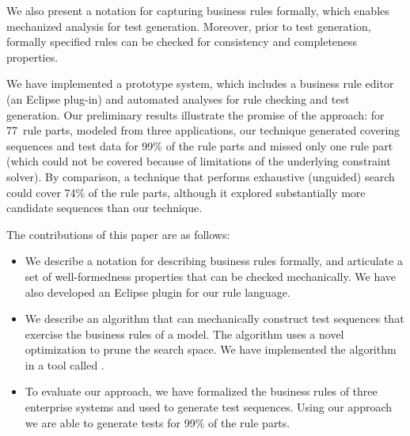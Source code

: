 We also present a notation for capturing business rules formally, which enables
mechanized analysis for test generation. Moreover, prior to test generation,
formally specified rules can be checked for consistency and completeness
properties.

We have implemented a prototype system, which includes a business rule editor
(an Eclipse plug-in) and automated analyses for rule checking and test
generation. Our preliminary results illustrate the promise of the approach: for
77~rule parts, modeled from three applications, our technique generated covering
sequences and test data for 99\% of the rule parts and missed only one rule part
(which could not be covered because of limitations of the underlying constraint
solver). By comparison, a technique that performs exhaustive (unguided) search
could cover 74\% of the rule parts, although it explored substantially more
candidate sequences than our technique.

The contributions of this paper are as follows:
\begin{itemize}[noitemsep]
\item We describe a notation for describing business rules formally, and articulate
  a set of well-formedness properties that can be checked mechanically. We have 
  also developed an Eclipse plugin for our rule language.
\item We describe an algorithm that can mechanically construct test sequences
  that exercise the business rules of a model. The algorithm uses a
  novel optimization to prune the search space. We have implemented
  the algorithm in a tool called \tool{}.
\item To evaluate our approach, we have formalized the business rules
  of three enterprise systems and used \tool{} to generate test
  sequences. Using our approach we are able to generate tests for 99\%
  of the rule parts.
\end{itemize}

